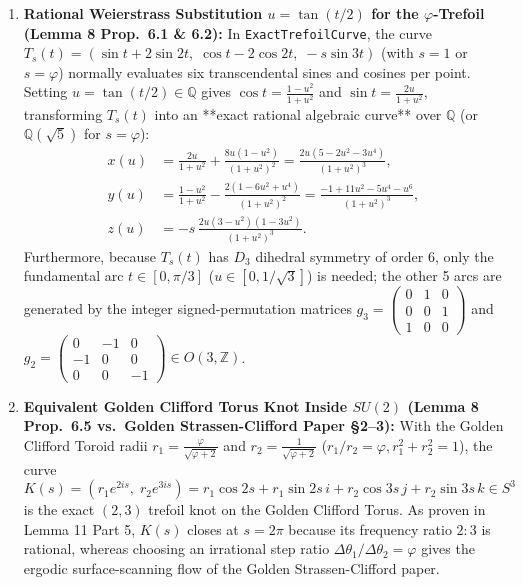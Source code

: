 \documentclass[11pt, a4paper]{article}
\begin{document}
\begin{enumerate}
    \item \textbf{Rational Weierstrass Substitution $u = \tan(t/2)$ for the $\varphi$-Trefoil (Lemma 8 Prop.~6.1 \& 6.2):}
    In \texttt{ExactTrefoilCurve}, the curve $T_s(t) = (\sin t + 2\sin 2t,\; \cos t - 2\cos 2t,\; -s\sin 3t)$ (with $s = 1$ or $s = \varphi$) normally evaluates six transcendental sines and cosines per point. Setting $u = \tan(t/2) \in \mathbb{Q}$ gives $\cos t = \frac{1-u^2}{1+u^2}$ and $\sin t = \frac{2u}{1+u^2}$, transforming $T_s(t)$ into an **exact rational algebraic curve** over $\mathbb{Q}$ (or $\mathbb{Q}(\sqrt{5})$ for $s = \varphi$):
    \begin{align}
    x(u) &= \frac{2u}{1+u^2} + \frac{8u(1-u^2)}{(1+u^2)^2} = \frac{2u(5 - 2u^2 - 3u^4)}{(1+u^2)^3}, \\
    y(u) &= \frac{1-u^2}{1+u^2} - \frac{2(1 - 6u^2 + u^4)}{(1+u^2)^2} = \frac{-1 + 11u^2 - 5u^4 - u^6}{(1+u^2)^3}, \\
    z(u) &= -s\,\frac{2u(3 - u^2)(1 - 3u^2)}{(1+u^2)^3}.
    \end{align}
    Furthermore, because $T_s(t)$ has $D_3$ dihedral symmetry of order $6$, only the fundamental arc $t \in [0, \pi/3]$ ($u \in [0, 1/\sqrt{3}]$) is needed; the other 5 arcs are generated by the integer signed-permutation matrices $g_3 = \begin{pmatrix}0&1&0\\0&0&1\\1&0&0\end{pmatrix}$ and $g_2 = \begin{pmatrix}0&-1&0\\-1&0&0\\0&0&-1\end{pmatrix} \in O(3,\mathbb{Z})$.
    \item \textbf{Equivalent Golden Clifford Torus Knot Inside $SU(2)$ (Lemma 8 Prop.~6.5 vs.\ Golden Strassen-Clifford Paper §2--3):}
    With the Golden Clifford Toroid radii $r_1 = \frac{\varphi}{\sqrt{\varphi+2}}$ and $r_2 = \frac{1}{\sqrt{\varphi+2}}$ ($r_1/r_2 = \varphi, r_1^2 + r_2^2 = 1$), the curve
    \begin{equation}
    K(s) = \left(r_1 e^{2is},\; r_2 e^{3is}\right) = r_1\cos 2s + r_1\sin 2s\,i + r_2\cos 3s\,j + r_2\sin 3s\,k \in S^3
    \end{equation}
    is the exact $(2,3)$ trefoil knot on the Golden Clifford Torus. As proven in Lemma 11 Part 5, $K(s)$ closes at $s = 2\pi$ because its frequency ratio $2:3$ is rational, whereas choosing an irrational step ratio $\Delta\theta_1 / \Delta\theta_2 = \varphi$ gives the ergodic surface-scanning flow of the Golden Strassen-Clifford paper.
\end{enumerate}
\end{document}
